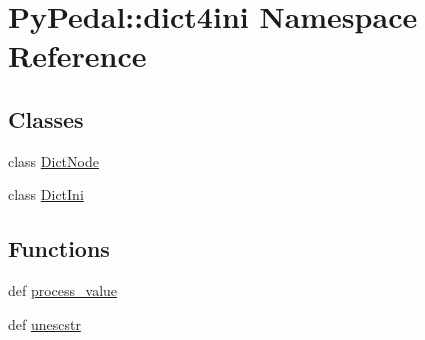 \hypertarget{namespacePyPedal_1_1dict4ini}{
\section{PyPedal::dict4ini Namespace Reference}
\label{namespacePyPedal_1_1dict4ini}
}


\subsection*{Classes}
\begin{CompactItemize}
\item 
class \hyperlink{classPyPedal_1_1dict4ini_1_1DictNode}{DictNode}
\item 
class \hyperlink{classPyPedal_1_1dict4ini_1_1DictIni}{DictIni}
\end{CompactItemize}
\subsection*{Functions}
\begin{CompactItemize}
\item 
\hypertarget{namespacePyPedal_1_1dict4ini_b7baa094c80241ba0a5f9f0573ba1369}{
def \hyperlink{namespacePyPedal_1_1dict4ini_b7baa094c80241ba0a5f9f0573ba1369}{process\_\-value}}
\label{namespacePyPedal_1_1dict4ini_b7baa094c80241ba0a5f9f0573ba1369}

\item 
\hypertarget{namespacePyPedal_1_1dict4ini_5d75e2fe541225a509167dfd5eb42ccf}{
def \hyperlink{namespacePyPedal_1_1dict4ini_5d75e2fe541225a509167dfd5eb42ccf}{unescstr}}
\label{namespacePyPedal_1_1dict4ini_5d75e2fe541225a509167dfd5eb42ccf}

\end{CompactItemize}
